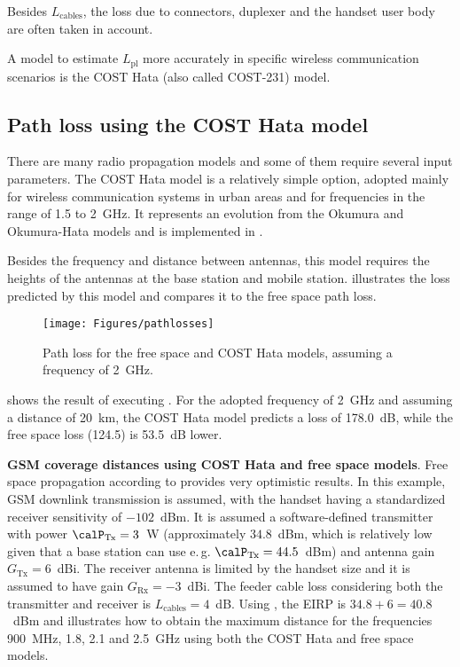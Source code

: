 Besides $L_{\text{cables}}$, the loss due to connectors, duplexer and the handset user body are often 
taken in account.

A model to estimate $L_{\textrm{pl}}$ more accurately
in specific wireless communication scenarios is the COST Hata (also called COST-231) model.

\subsection{Path loss using the COST Hata model}

There are many radio propagation models and some of them require several input parameters. 
The COST Hata model is a relatively simple option, adopted mainly for 
wireless communication systems in urban areas and for
frequencies in the range of 1.5 to 2~GHz. It represents an evolution from the Okumura and Okumura-Hata
models and is implemented in .

Besides the frequency and distance between antennas, this model requires
the heights of the antennas at the base station and mobile station.
 illustrates the loss predicted by this model and compares
it to the free space path loss.


\begin{figure}[htbp]
  \begin{center}
    \texttt{[image: Figures/pathlosses]}
  \end{center}
  \caption{Path loss for the free space and COST Hata models, assuming a frequency of 2~GHz.\label{fig:pathlosses}}  
\end{figure}

 shows the result of executing . For the adopted
frequency of 2~GHz and assuming a distance of 20~km, the COST Hata model predicts a loss 
of 178.0~dB, while the free space loss (124.5) is 53.5~dB lower.

\bExample \textbf{GSM coverage distances using COST Hata and free space models}. 
\label{ex:gsmcoverage}
Free space propagation according to  provides very optimistic results. In this example, GSM downlink transmission
is assumed, with the handset having a standardized receiver sensitivity of $-102$~dBm. It is assumed a 
software-defined transmitter with power $\calP_{\textrm{Tx}}=3$~W 
(approximately $34.8$~dBm, which is relatively low given that
a base station can use e.\,g. $\calP_{\textrm{Tx}}=44.5$~dBm) and antenna gain $G_{\textrm{Tx}}=6$~dBi.
The receiver antenna is limited by the handset size and it is assumed to have 
gain $G_{\textrm{Rx}}=-3$~dBi. 
The feeder cable loss considering both the transmitter and receiver is $L_{\text{cables}}=4$~dB. 
Using , the EIRP is $34.8+6=40.8$~dBm and  illustrates
how to obtain the maximum distance for the frequencies 900~MHz, 1.8, 2.1 and 2.5~GHz using
both the COST Hata and free space models.

